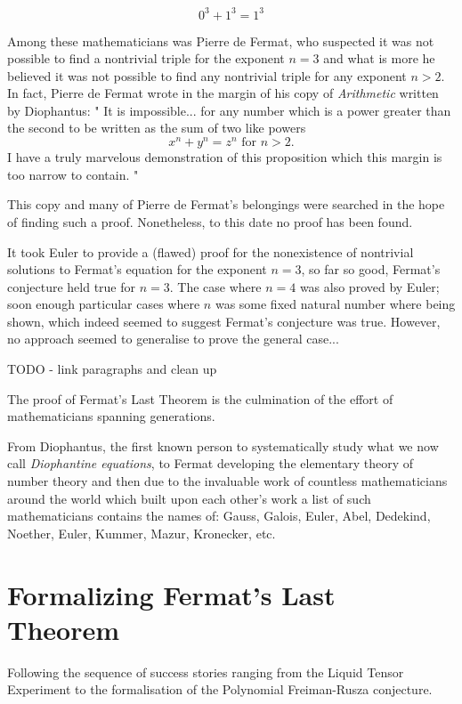 \[
0^3 + 1^3 = 1^3
\]

Among these mathematicians was Pierre de Fermat, who suspected it was not possible to find a nontrivial triple for the exponent $n= 3$ and what is more he believed
it was not possible to find any nontrivial triple for any exponent $n > 2$. In fact, Pierre de Fermat wrote in the margin of his copy of \textit{Arithmetic} written by Diophantus:
"
It is impossible... for any number which is a power greater than the second to be written as the sum of two like powers 
\[ 
x^n + y^n = z^n \text{ for } n > 2.
\]
I have a truly marvelous demonstration of this proposition which this margin is too narrow to contain.
"

This copy and many of Pierre de Fermat's belongings were searched in the hope of finding such a proof. Nonetheless, to this date no proof has been found.


It took Euler to provide a (flawed) proof for the nonexistence of nontrivial solutions to Fermat's equation for the exponent $n = 3$, so far so good, Fermat's conjecture held true for $n = 3$.
The case where $n = 4$ was also proved by Euler; soon enough particular cases where $n$ was some fixed natural number where being shown, which indeed seemed to suggest Fermat's conjecture was true.
However, no approach seemed to generalise to prove the general case...


TODO - link paragraphs and clean up

The proof of Fermat's Last Theorem is the culmination of the effort of mathematicians spanning generations.

From Diophantus, the first known person to systematically study what we now call \textit{Diophantine equations}, to Fermat developing the elementary theory of number theory and then due to the invaluable work of countless mathematicians 
around the world which built upon each other's work a list of such mathematicians contains the names of: Gauss, Galois, Euler, Abel, Dedekind, Noether, Euler, Kummer, Mazur, Kronecker, etc.



\section{Formalizing Fermat's Last Theorem}

Following the sequence of success stories ranging from the Liquid Tensor Experiment to the formalisation of the Polynomial Freiman-Rusza conjecture. 

